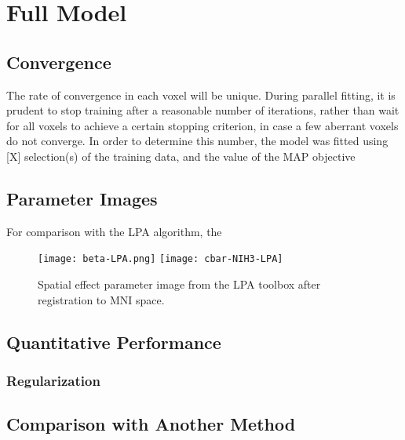 \section{Full Model}
\subsection{Convergence}
The rate of convergence in each voxel will be unique.
During parallel fitting, it is prudent to stop training after a reasonable number of iterations, rather than wait for all voxels to achieve a certain stopping criterion, in case a few aberrant voxels do not converge.
In order to determine this number, the model was fitted using [X] selection(s) of the training data, and the value of the MAP objective 


\subsection{Parameter Images}\label{ss:paramimg}

For comparison with the LPA algorithm, the
\begin{figure}
  \centering\texttt{[image: beta-LPA.png]} \texttt{[image: cbar-NIH3-LPA]}
  \caption{Spatial effect parameter image from the LPA toolbox after registration to MNI space.}
  \label{fig:B-lpa}
\end{figure}

\subsection{Quantitative Performance}
\subsubsection{Regularization}
\subsection{Comparison with Another Method}

